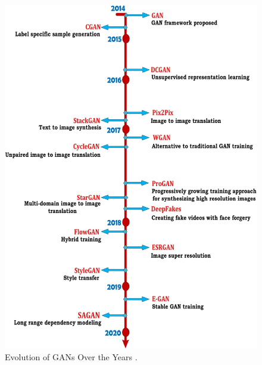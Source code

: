 \begin{figure}
        \begin{center}
 	    \includegraphics[scale=0.25]{images/GANEvolution.jpg}
	    \caption[Evolution of \acp{GAN} Over the Years.]{Evolution of \acp{GAN} Over the Years \cite{PavanKumar.2021}.}
	    \label{fig:GANEvolution}
	    \end{center}
\end{figure}



